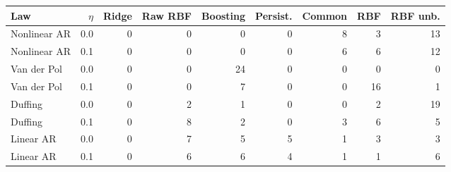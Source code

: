 \begin{tabular}{@{}lrrrrrrrr@{}}
\toprule
Law & $\eta$ & Ridge & Raw RBF & Boosting & Persist. & Common & RBF & RBF unb. \\
\midrule
Nonlinear AR & 0.0 & 0 & 0 & 0 & 0 & 8 & 3 & 13 \\
Nonlinear AR & 0.1 & 0 & 0 & 0 & 0 & 6 & 6 & 12 \\
Van der Pol & 0.0 & 0 & 0 & 24 & 0 & 0 & 0 & 0 \\
Van der Pol & 0.1 & 0 & 0 & 7 & 0 & 0 & 16 & 1 \\
Duffing & 0.0 & 0 & 2 & 1 & 0 & 0 & 2 & 19 \\
Duffing & 0.1 & 0 & 8 & 2 & 0 & 3 & 6 & 5 \\
Linear AR & 0.0 & 0 & 7 & 5 & 5 & 1 & 3 & 3 \\
Linear AR & 0.1 & 0 & 6 & 6 & 4 & 1 & 1 & 6 \\
\bottomrule
\end{tabular}
